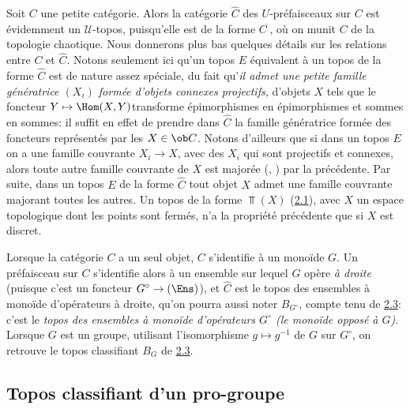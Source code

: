 \documentclass[10pt]{../fichiers-configuration-latex/smfart}
\begin{document}
Soit $C$ une petite catégorie. Alors la catégorie $\widehat{C}$
des $U$-préfaisceaux sur $C$ est évidemment un
$𝒰$-topos, puisqu'elle est de la forme
$C^{\widetilde{\phantom{,}}}$, où on munit $C$ de la topologie
chaotique. Nous donnerons plus bas quelques détails sur les
relations entre $C$ et $\widehat{C}$. Notons seulement ici qu'un
topos $E$ équivalent à un topos de la forme $\widehat{C}$ est de
nature assez spéciale, du fait qu'\emph{il admet une petite
famille génératrice $(X_i)$ formée d'objets connexes
projectifs,} \ie d'objets $X$ tels que le foncteur $Y\mapsto
\Hom(X,Y)$\pageoriginale transforme épimorphismes en
épimorphismes et sommes en sommes: il suffit en effet de prendre
dans $\widehat{C}$ la famille génératrice formée des foncteurs
représentés par les $X\in \ob C$. Notons d'ailleurs que si dans
un topos $E$ on a une famille couvrante $X_i\rightarrow X$, avec des
$X_i$ qui sont projectifs et connexes, alors toute autre famille
couvrante de $X$ est majorée (, )
par la précédente. Par suite, dans un topos $E$ de la forme
$\widehat{C}$ tout objet $X$ admet une famille couvrante majorant
toutes les autres. Un topos de la forme $\Top(X)$
(\hyperref[IV.subsec2.1]{2.1}), avec $X$ un espace topologique dont les points
sont fermés, n'a la propriété précédente que si $X$ est
discret.

Lorsque la catégorie $C$ a un seul objet, $C$ s'identifie à un
monoïde $G$. Un préfaisceau sur $C$ s'identifie alors à un ensemble
sur lequel $G$ opère \emph{à droite} (puisque c'est un foncteur
$G^{\circ}\rightarrow (\Ens)$), et $\widehat{C}$ est le topos des
ensembles à monoïde d'opérateurs à droite, qu'on pourra aussi noter
$B_{G^{\circ}}$, compte tenu de \hyperref[IV.subsec2.3]{2.3}: c'est le
\emph{topos des ensembles à monoïde d'opérateurs $G^{\circ}$ (le
monoïde opposé à $G$)}. Lorsque $G$ est un groupe, utilisant
l'isomorphisme $g\mapsto g^{-1}$ de $G$ sur $G^{\circ}$, on retrouve
le topos classifiant $B_G$ de \hyperref[IV.subsec2.3]{2.3}.

\subsection{Topos classifiant d'un pro-groupe}
\end{document}

